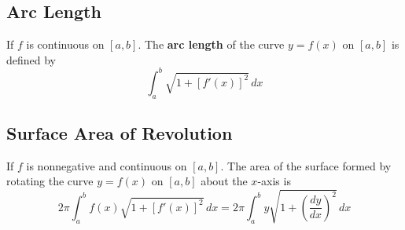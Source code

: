\documentclass[../ma2002_notes.tex]{subfiles}
\begin{document}
\subsection{Arc Length}
If \(f\) is continuous on \([a,b]\). The \textbf{arc length} of the curve \(y=f(x)\) on \([a,b]\) is defined by
\[\int_a^b\sqrt{1+[f'(x)]^2}\,dx\]

\subsection{Surface Area of Revolution}
If \(f\) is nonnegative and continuous on \([a,b]\). The area of the surface formed by rotating the curve \(y=f(x)\) on \([a,b]\) about the \(x\)-axis is
\[2\pi\int_a^bf(x)\sqrt{1+[f'(x)]^2}\,dx=2\pi\int_a^by\sqrt{1+\left(\frac{dy}{dx}\right)^2}\,dx\]
\end{document}
